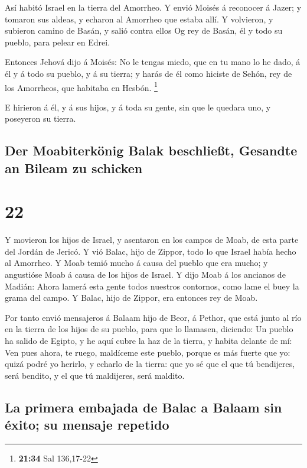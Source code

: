  Así habitó Israel en la tierra del Amorrheo. 
Y envió Moisés á reconocer á Jazer; y tomaron sus aldeas, y echaron al
Amorrheo que estaba allí.  Y volvieron, y subieron camino
de Basán, y salió contra ellos Og rey de Basán, él y todo su pueblo,
para pelear en Edrei.

 Entonces Jehová dijo á Moisés: No le tengas miedo, que en
tu mano lo he dado, á él y á todo su pueblo, y á su tierra; y harás de
él como hiciste de Sehón, rey de los Amorrheos, que habitaba en Hesbón.
\footnote{\textbf{21:34} Sal 136,17-22}

 E hirieron á él, y á sus hijos, y á toda su gente, sin que
le quedara uno, y poseyeron su tierra.

\hypertarget{der-moabiterkuxf6nig-balak-beschlieuxdft-gesandte-an-bileam-zu-schicken}{%
\subsection{Der Moabiterkönig Balak beschließt, Gesandte an Bileam zu
schicken}\label{der-moabiterkuxf6nig-balak-beschlieuxdft-gesandte-an-bileam-zu-schicken}}

\hypertarget{section-21}{%
\section{22}\label{section-21}}

 Y movieron los hijos de Israel, y asentaron en los campos
de Moab, de esta parte del Jordán de Jericó.  Y vió Balac,
hijo de Zippor, todo lo que Israel había hecho al Amorrheo. 
Y Moab temió mucho á causa del pueblo que era mucho; y angustióse Moab á
causa de los hijos de Israel.  Y dijo Moab á los ancianos de
Madián: Ahora lamerá esta gente todos nuestros contornos, como lame el
buey la grama del campo. Y Balac, hijo de Zippor, era entonces rey de
Moab.

 Por tanto envió mensajeros á Balaam hijo de Beor, á Pethor,
que está junto al río en la tierra de los hijos de su pueblo, para que
lo llamasen, diciendo: Un pueblo ha salido de Egipto, y he aquí cubre la
haz de la tierra, y habita delante de mí:  Ven pues ahora,
te ruego, maldíceme este pueblo, porque es más fuerte que yo: quizá
podré yo herirlo, y echarlo de la tierra: que yo sé que el que tú
bendijeres, será bendito, y el que tú maldijeres, será maldito.

\hypertarget{la-primera-embajada-de-balac-a-balaam-sin-uxe9xito-su-mensaje-repetido}{%
\subsection{La primera embajada de Balac a Balaam sin éxito; su mensaje
repetido}\label{la-primera-embajada-de-balac-a-balaam-sin-uxe9xito-su-mensaje-repetido}}


